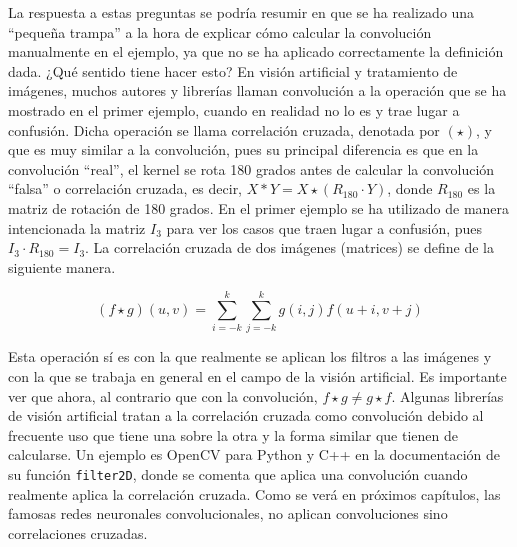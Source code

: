 		La respuesta a estas preguntas se podría resumir en que se ha realizado una ``pequeña trampa'' a la hora de explicar cómo calcular la convolución manualmente en el ejemplo, ya que no se ha aplicado correctamente la definición dada. ¿Qué sentido tiene hacer esto? En visión artificial y tratamiento de imágenes, muchos autores y librerías llaman convolución a la operación que se ha mostrado en el primer ejemplo, cuando en realidad no lo es y trae lugar a confusión. Dicha operación se llama correlación cruzada, denotada por $(\star)$, y que es muy similar a la convolución, pues su principal diferencia es que en la convolución ``real'', el kernel se rota 180 grados antes de calcular la convolución ``falsa'' o correlación cruzada, es decir, $X \ast Y = X \star (R_{180} \cdot Y)$, donde $R_{180}$ es la matriz de rotación de 180 grados. En el primer ejemplo se ha utilizado de manera intencionada la matriz $I_3$ para ver los casos que traen lugar a confusión, pues $I_3 \cdot R_{180} = I_3$. La correlación cruzada de dos imágenes (matrices) se define de la siguiente manera\cite{Goodfellow-et-al-2016}. 
		
		$$
		(f \star g)(u, v) = \sum_{i=-k}^{k}\sum_{j=-k}^{k} g(i, j)f(u + i, v + j)
		$$
		
		Esta operación sí es con la que realmente se aplican los filtros a las imágenes y con la que se trabaja en general en el campo de la visión artificial. Es importante ver que ahora, al contrario que con la convolución, $f \star g \neq g \star f$. Algunas librerías de visión artificial tratan a la correlación cruzada como convolución debido al frecuente uso que tiene una sobre la otra y la forma similar que tienen de calcularse. Un ejemplo es OpenCV para Python y C++ en la documentación de su función \texttt{filter2D}, donde se comenta que aplica una convolución cuando realmente aplica la correlación cruzada\cite{OpenCVFiltering}. Como se verá en próximos capítulos, las famosas redes neuronales convolucionales, no aplican convoluciones sino correlaciones cruzadas. \\
		
